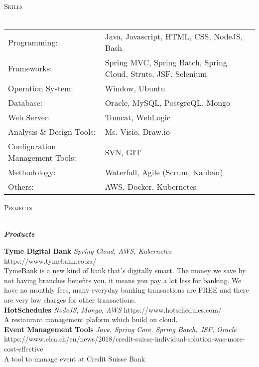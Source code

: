 \documentclass[a4paper]{article}
\newcommand{\lineunder} {
    \vspace*{-8pt} \\
    \hspace*{-18pt} \hrulefill \\
}
\newcommand{\header} [1] {
    {\hspace*{-18pt}\vspace*{6pt} \textsc{#1}}
    \vspace*{-6pt} \lineunder
}
\begin{document}
\newpage
\header{Skills}
\begin{tabular}{ l l }
	Programming:                           & Java, Javascript, HTML, CSS, NodeJS, Bash                     \\
	Frameworks:                     & Spring MVC, Spring Batch, Spring Cloud, Struts, JSF, Selenium \\
	Operation System:               & Window, Ubuntu                                                \\
	Database:                       & Oracle, MySQL, PostgreQL, Mongo                               \\
	Web Server:                     & Tomcat, WebLogic                                              \\
	Analysis \& Design Tools:       & Ms. Visio, Draw.io                                            \\
	Configuration Management Tools: & SVN, GIT                                                      \\
	Methodology:                    & Waterfall, Agile (Scrum, Kanban)                              \\
	Others:                         & AWS, Docker, Kubernetes                                       \\
\end{tabular}
\vspace{2mm}

\header{Projects}
\begin{center}
	\textbf{\textit{Products}}
\end{center}

{\textbf{Tyme Digital Bank}} {\sl Spring Cloud, AWS, Kubernetes} \hfill https://www.tymebank.co.za/\\
TymeBank is a new kind of bank that’s digitally smart. The money we save by not having branches benefits you, it means you pay a lot less for banking. We have no monthly fees, many everyday banking transactions are FREE and there are very low charges for other transactions.\\
\vspace*{2mm}
{\textbf{HotSchedules}} {\sl NodeJS, Mongo, AWS} \hfill https://www.hotschedules.com/\\
A restaurant management plaform which build on cloud.\\
\vspace*{2mm}
{\textbf{Event Management Tools}} {\sl Java, Spring Core, Spring Batch, JSF, Oracle} \hfill https://www.elca.ch/en/news/2018/credit-suisse-individual-solution-was-more-cost-effective\\
A tool to manage event at Credit Suisse Bank\\
\vspace*{2mm}
\end{document}
